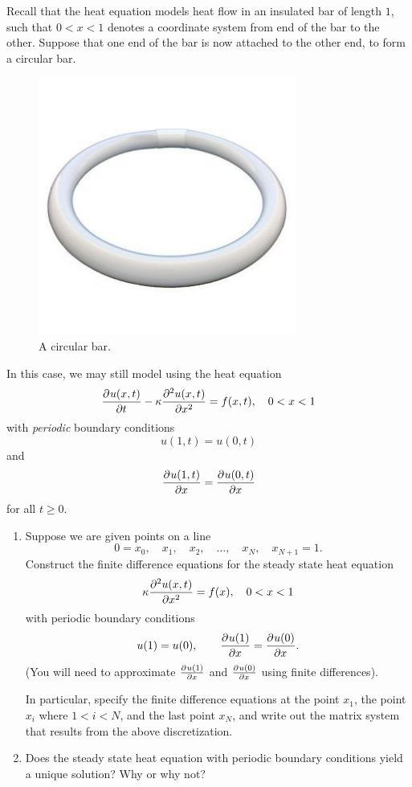 
Recall that the heat equation models heat flow in an insulated bar of length $1$, such that $0 < x < 1$ denotes a coordinate system from end of the bar to the other.  Suppose that one end of the bar is now attached to the other end, to form a circular bar.  
\begin{figure}
\centering
\includegraphics[width=.35\textwidth]{CIRCULAR_TUBE.jpg}
\caption{A circular bar.}
\end{figure}
In this case, we may still model using the heat equation 
\[
\frac{\partial^{} u(x,t)}{\partial t^{}} - \kappa\frac{\partial^{2} u(x,t)}{\partial x^{2}} = f(x,t), \quad 0 < x < 1
\]
with \emph{periodic} boundary conditions
\[
u(1,t) = u(0,t)
\]
and
\[
\frac{\partial^{} u(1,t)}{\partial x^{}} = \frac{\partial^{} u(0,t)}{\partial x^{}}
\]
for all $t \geq  0$. 
\begin{enumerate}
\item Suppose we are given points on a line 
\[
0 = x_0, \quad x_1, \quad x_2, \quad\ldots,\quad x_N, \quad x_{N+1} = 1.
\]
Construct the finite difference equations for the steady state heat equation 
\[
\kappa\frac{\partial^{2} u(x,t)}{\partial x^{2}} = f(x), \quad 0 < x < 1
\]
with periodic boundary conditions
\[
u(1) = u(0), \qquad \frac{\partial^{} u(1)}{\partial x^{}} = \frac{\partial^{} u(0)}{\partial x^{}}.
\]
(You will need to approximate $\frac{\partial^{} u(1)}{\partial x^{}}$ and $\frac{\partial^{} u(0)}{\partial x^{}}$ using finite differences).  

In particular, specify the finite difference equations at the point $x_1$, the point $x_i$ where $ 1< i <N$, and the last point $x_N$, and write out the matrix system that results from the above discretization. 

\item Does the steady state heat equation with periodic boundary conditions yield a unique solution?  Why or why not?  
\end{enumerate}


